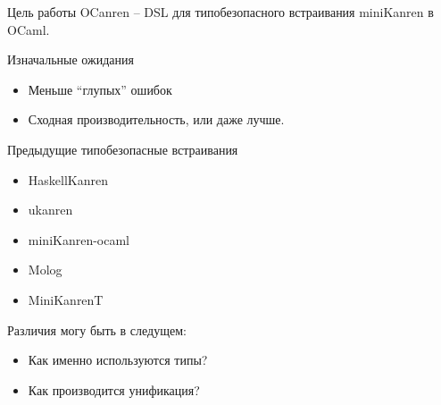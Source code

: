 \documentclass[10pt, mathserif]{beamer}
\theoremstyle{definition}
\begin{document}
\begin{frame}[fragile]{Цель работы}
OCanren -- DSL для типобезопасного встраивания miniKanren в OCaml.
\end{frame}

\begin{frame}[fragile]{Изначальные ожидания}
\begin{itemize}
 \item Меньше ``глупых'' ошибок
 \item Сходная производительность, или даже лучше.
\end{itemize}

\end{frame}

\begin{frame}[fragile]{Предыдущие типобезопасные встраивания}
\begin{itemize}
 \item HaskellKanren    \href{https://github.com/JaimieMurdock/HK}{\faGithub}
 \item ukanren          \href{https://github.com/rntz/ukanren}{\faGithub}
 \item miniKanren-ocaml \href{https://github.com/lightyang/minikanren-ocaml}{\faGithub}
 \item Molog            \href{https://github.com/acfoltzer/Molog}{\faGithub}
 \item MiniKanrenT      \href{https://github.com/jvranish/MiniKanrenT}{\faGithub}
\end{itemize}
\pause
\vspace{1in}
Различия могу быть в следущем:
\begin{itemize}
 \item Как именно используются типы?
 \item Как производится унификация?
\end{itemize}


\end{frame}
\end{document}
